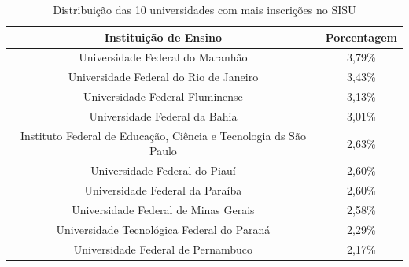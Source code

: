                 \begin{table}[]
                    \centering
                    \begin{tabular}{cc}
                    \hline
                    \textbf{Instituição de Ensino}                                   & \textbf{Porcentagem} \\ \hline
                    Universidade Federal do Maranhão                                 & 3,79\%               \\ \hline
                    Universidade Federal do Rio de Janeiro                           & 3,43\%               \\ \hline
                    Universidade Federal Fluminense                                  & 3,13\%               \\ \hline
                    Universidade Federal da Bahia                                    & 3,01\%               \\ \hline
                    Instituto Federal de Educação, Ciência e Tecnologia ds São Paulo & 2,63\%               \\ \hline
                    Universidade Federal do Piauí                                    & 2,60\%               \\ \hline
                    Universidade Federal da Paraíba                                  & 2,60\%               \\ \hline
                    Universidade Federal de Minas Gerais                             & 2,58\%               \\ \hline
                    Universidade Tecnológica Federal do Paraná                       & 2,29\%               \\ \hline
                    Universidade Federal de Pernambuco                               & 2,17\%               \\ \hline
                    \end{tabular}
                    \caption{Distribuição das 10 universidades com mais inscrições no SISU}
                    \label{tab:universidade-inscricao}
                    \end{table}

